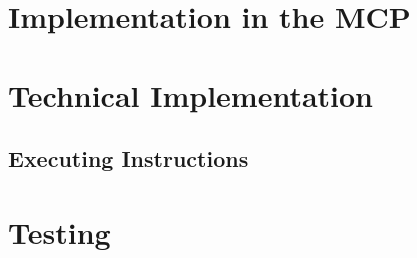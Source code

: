 \section{Implementation in the MCP}


\section{Technical Implementation}



\subsection{Executing Instructions}

\section{Testing}

